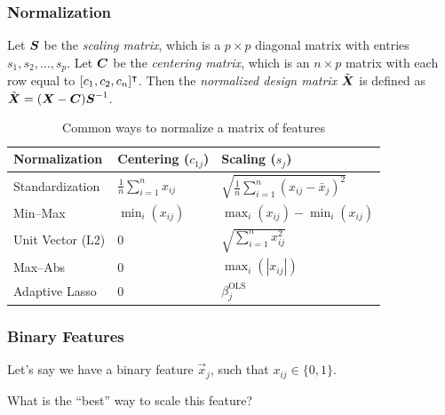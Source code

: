 \documentclass[10pt]{beamer}
\begin{document}
\begin{frame}[c]
  \frametitle{Normalization}

  Let \(\boldsymbol S\) be the \emph{scaling matrix}, which is a \(p \times p\) diagonal matrix with entries \(s_1, s_2, \dots, s_p\). Let \(\boldsymbol C\) be the \emph{centering matrix}, which is an \(n \times p\) matrix with each row equal to \([c_1, c_2, c_n]^\intercal\). Then the \emph{normalized design matrix} \(\tilde{\boldsymbol X}\) is defined as \(\tilde{\boldsymbol X} = (\boldsymbol X - \boldsymbol C)\boldsymbol S^{-1}\).
\end{frame}

\begin{frame}[c]
  \begin{table}[hbt]
    \centering
    \caption{Common ways to normalize a matrix of features}
    \label{tab:normalization-types}
    \begin{tabular}{lll}
      \toprule
      Normalization    & Centering (\(c_{1j}\))             & Scaling (\(s_j\))                                         \\
      \midrule
      Standardization  & \(\frac{1}{n}\sum_{i=1}^n x_{ij}\) & \(\sqrt{\frac{1}{n}\sum_{i=1}^n (x_{ij} - \bar{x}_j)^2}\) \\
      \addlinespace
      Min--Max         & \(\min_i(x_{ij})\)                 & \(\max_i(x_{ij}) - \min_i(x_{ij})\)                       \\
      \addlinespace
      Unit Vector (L2) & 0                                  & \(\sqrt{\sum_{i=1}^n x_{ij}^2}\)                          \\
      \addlinespace
      Max--Abs         & 0                                  & \(\max_i(|x_{ij}|)\)                                      \\
      \addlinespace
      Adaptive Lasso   & 0                                  & \(\beta_j^\text{OLS}\)                                    \\
      \bottomrule
    \end{tabular}
  \end{table}
\end{frame}

\begin{frame}[c]
  \frametitle{Binary Features}

  Let's say we have a binary feature \(\vec{x}_j\), such that \(x_{ij} \in \{0, 1\}\).

  \medskip

  What is the ``best'' way to scale this feature?

\end{frame}
\end{document}
